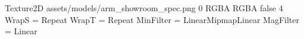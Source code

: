 Texture2D
assets/models/arm_showroom_spec.png
0
RGBA
RGBA
false
4
WrapS = Repeat
WrapT = Repeat
MinFilter = LinearMipmapLinear
MagFilter = Linear
